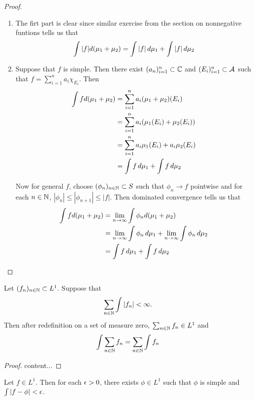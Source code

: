 \documentclass{book}
\begin{document}
	\begin{proof}
		\begin{enumerate}
			\item The firt part is clear since similar exercise from the section on nonnegative funtions tells us that $$\int |f| d(\mu_1 + \mu_2) = \int |f| \, d \mu_1 + \int |f| \, d \mu_2$$
			
			
			\item Suppose that $f$ is simple. Then there exist $(a_n)_{i=1}^n \subset \mathbb{C}$ and $(E_i)_{i=1}^n \subset \mathcal{A}$ such that $f = \sum\limits_{i =1}^n a_i \chi_{E_i}$. Then 
			\begin{align*}
				\int f d(\mu_1 + \mu_2) 
				&= \sum\limits_{i =1}^n a_i (\mu_1 + \mu_2)(E_i)\\
				&= \sum\limits_{i =1}^n a_i (\mu_1(E_i) + \mu_2(E_i))\\
				&= \sum\limits_{i =1}^n a_i \mu_1(E_i) + a_i \mu_2(E_i)\\
				&= \int f \, d \mu_1 + \int f \, d \mu_2
			\end{align*}
			
			Now for general $f$, choose $(\phi_n)_{n \in \mathbb{N}} \subset S$ such that $\phi_n \rightarrow f$ pointwise and for each $n \in \mathbb{N}$, $|\phi_n| \leq |\phi_{n+1}| \leq |f|$. Then dominated convergence tells us that 
			\begin{align*}
				\int f d(\mu_1 + \mu_2) 
				&= \lim \limits_{n \rightarrow \infty} \int \phi_n d(\mu_1 + \mu_2)\\
				&= \lim \limits_{n \rightarrow \infty} \int \phi_n \, d \mu_1 + \lim \limits_{n \rightarrow \infty} \int \phi_n \, d \mu_2 \\
				&= \int f \, d \mu_1 + \int f \, d \mu_2
			\end{align*}
		\end{enumerate}
	\end{proof}
	
	\begin{ex} 
		Let $(f_n)_{n \in \mathbb{N}} \subset L^1$. Suppose that $$\sum_{n \in \mathbb{N}} \int |f_n| < \infty.$$ Then after redefinition on a set of measure zero, $\sum_{n \in \mathbb{N}}f_n \in L^1$ and $$\int \sum_{n \in \mathbb{N}}f_n = \sum_{n \in \mathbb{N}} \int f_n$$
	\end{ex}

	\begin{proof}
		content...
	\end{proof}
	
	\begin{ex} 
		Let $f \in L^1$. Then for each $\epsilon > 0$, there exists $\phi \in L^1$ such that $\phi$ is simple and $\int |f - \phi| < \epsilon$.  
	\end{ex}
\end{document}
